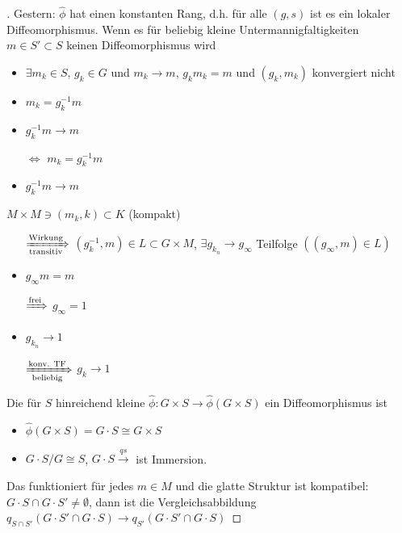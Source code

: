 \begin{proof}[]
	Gestern: $\hat\phi$ hat einen konstanten Rang, d.h. für alle $(g,s)$ ist es ein lokaler Diffeomorphismus. Wenn es für beliebig kleine Untermannigfaltigkeiten $m\in S'\subset S$ keinen Diffeomorphismus wird\begin{itemize}[label={$\Rightarrow$},topsep=-0.25\baselineskip]
		\item $\exists m_k\in 	S$, $g_k\in G$ und $m_k\to m$, $g_k m_k= m$ und $(g_k,m_k)$ konvergiert nicht \item $m_k = g_k^{-1} m$ 
		\item $g_k^{-1}m\to m$
		\item[$\Leftrightarrow$] $m_k = g_k^{-1} m$
		\item $g_k^{-1} m\to m$
	\end{itemize}
	$M\times M\ni (m_k,k)\subset K$ (kompakt)
	\begin{itemize}[label={$\Rightarrow$},topsep=-0.25\baselineskip,wide=0pt,leftmargin=*,align=right,widest={$\xRightarrow[\text{beliebig}]{\text{konv. TF}}$}]
		\item[{$\xRightarrow[\text{transitiv}]{\text{Wirkung}}$}]  $(g_k^{-1}, m)\in L\subset G\times M$, $\exists g_{k_n}\to g_\infty$ Teilfolge $((g_\infty, m)\in L)$
		\item $g_\infty m = m$
		\item[$\xRightarrow{\text{frei}}$] $g_\infty = 1$
		\item $g_{k_n} \to 1$
		\item[{$\xRightarrow[\text{beliebig}]{\text{konv. TF}}$}] $g_k\to 1$ \Lightning
	\end{itemize}
	Die für $S$ hinreichend kleine $\hat\phi\colon G\times S\to \hat\phi(G\times S)$ ein Diffeomorphismus ist\begin{itemize}[label={$\Rightarrow$},topsep=-0.25\baselineskip]
		\item $\hat\phi(G\times S) = G\cdot S\cong G\times S$
		\item $G\cdot S\slash G\cong S$, $G\cdot S\xrightarrow{qs}$ ist Immersion.
	\end{itemize}
	Das funktioniert für jedes $m\in M$ und die glatte Struktur ist kompatibel: $G\cdot S\cap G\cdot S'\neq \emptyset$, dann ist die Vergleichsabbildung $q_{S\cap S'} (G\cdot S'\cap G\cdot S)\to q_{S'}(G\cdot S'\cap G\cdot S)$
	

\end{proof}
